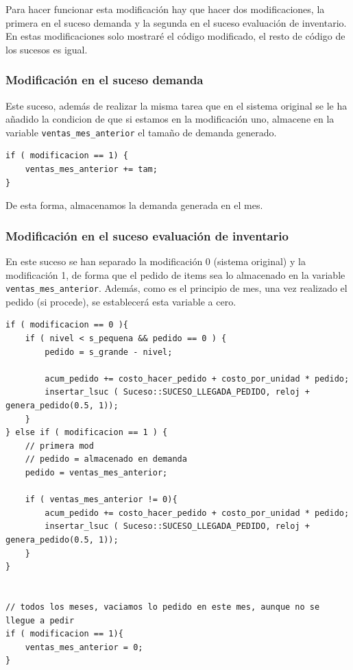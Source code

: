 \documentclass[12pt, spanish]{article}
\begin{document}
Para hacer funcionar esta modificación hay que hacer dos modificaciones, la primera en el suceso demanda y la segunda en el suceso evaluación de inventario. En estas modificaciones solo mostraré el código modificado, el resto de código de los sucesos es igual.

\subsubsection{Modificación en el suceso demanda}

Este suceso, además de realizar la misma tarea que en el sistema original se le ha añadido la condicion de que si estamos en la modificación uno, almacene en la variable \texttt{ventas\_mes\_anterior} el tamaño de demanda generado.

\begin{lstlisting}
if ( modificacion == 1) {
	ventas_mes_anterior += tam;
}
\end{lstlisting}

De esta forma, almacenamos la demanda generada en el mes.

\subsubsection{Modificación en el suceso evaluación de inventario}

En este suceso se han separado la modificación 0 (sistema original) y la modificación 1, de forma que el pedido de items sea lo almacenado en la variable \texttt{ventas\_mes\_anterior}. Además, como es el principio de mes, una vez realizado el pedido (si procede), se establecerá esta variable a cero.

\begin{lstlisting}
if ( modificacion == 0 ){
	if ( nivel < s_pequena && pedido == 0 ) {
		pedido = s_grande - nivel;

		acum_pedido += costo_hacer_pedido + costo_por_unidad * pedido;
		insertar_lsuc ( Suceso::SUCESO_LLEGADA_PEDIDO, reloj + genera_pedido(0.5, 1));
	}
} else if ( modificacion == 1 ) {
	// primera mod
	// pedido = almacenado en demanda
	pedido = ventas_mes_anterior;

	if ( ventas_mes_anterior != 0){
		acum_pedido += costo_hacer_pedido + costo_por_unidad * pedido;
		insertar_lsuc ( Suceso::SUCESO_LLEGADA_PEDIDO, reloj + genera_pedido(0.5, 1));
	}
}


// todos los meses, vaciamos lo pedido en este mes, aunque no se llegue a pedir
if ( modificacion == 1){
	ventas_mes_anterior = 0;
}
\end{lstlisting}
\end{document}
